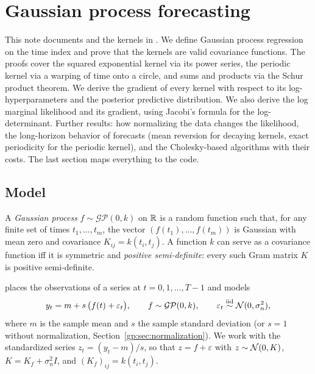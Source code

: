 \chapter{Gaussian process forecasting}\label{ch:gp}

This note documents  and the kernels in .
We define Gaussian process regression on the time index and prove that the
 kernels are valid covariance functions. The proofs cover the squared exponential kernel via
its power series, the periodic kernel via a warping of time onto a circle, and sums and
products via the Schur product theorem. We derive the gradient of every kernel with
respect to its log-hyperparameters and the posterior predictive distribution.
We also derive the log marginal likelihood and its gradient, using Jacobi's formula for
the log-determinant. Further results: how normalizing the data changes the likelihood, the
long-horizon behavior of forecasts (mean reversion for decaying kernels,
exact periodicity for the periodic kernel), and the Cholesky-based algorithms
with their costs. The last section maps everything to the code.




\section{Model}

\begin{definition}
A \emph{Gaussian process} $f\sim\mathcal{GP}(0,k)$ on $\mathbb{R}$ is a random
function such that, for any finite set of times $t_1,\dots,t_m$, the vector
$(f(t_1),\dots,f(t_m))$ is Gaussian with mean zero and covariance
$K_{ij}=k(t_i,t_j)$. A function $k$ can serve as a covariance function iff it is
symmetric and \emph{positive semi-definite}: every such Gram matrix $K$ is positive
semi-definite.
\end{definition}

 places the observations of a series at $t=0,1,\dots,T-1$ and
models
\begin{equation}\label{gp:eq:model}
  y_t = m + s\,\big(f(t) + \varepsilon_t\big),\qquad f\sim\mathcal{GP}(0,k),\qquad
  \varepsilon_t\overset{\text{iid}}{\sim}\mathcal{N}(0,\sigma_n^2),
\end{equation}
where $m$ is the sample mean and $s$ the sample standard deviation (or $s=1$
without normalization, Section~\ref{gp:sec:normalization}). We work with the
standardized series $z_t=(y_t-m)/s$, so that $z = f + \varepsilon$ with
$z\sim\mathcal{N}(0,K)$, $K = K_f + \sigma_n^2 I$, and $(K_f)_{ij}=k(t_i,t_j)$.

